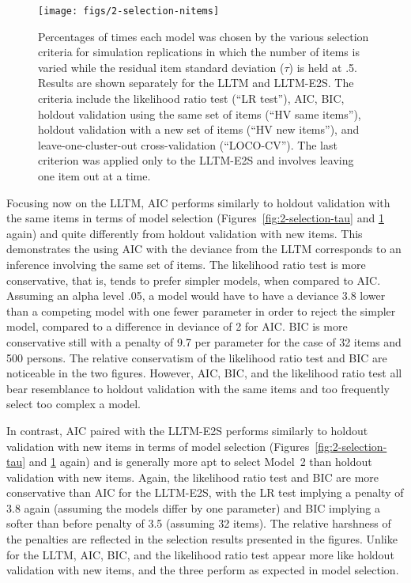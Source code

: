 \begin{figure}
	\centering
	\texttt{[image: figs/2-selection-nitems]}
	\caption{Percentages of times each model was chosen by the various selection criteria for simulation replications in which the number of items is varied while the residual item standard deviation ($\tau$) is held at .5. Results are shown separately for the LLTM and LLTM-E2S. The criteria include the likelihood ratio test (``LR test''), AIC, BIC, holdout validation using the same set of items (``HV same items''), holdout validation with a new set of items (``HV new items''), and leave-one-cluster-out cross-validation (``LOCO-CV''). The last criterion was applied only to the LLTM-E2S and involves leaving one item out at a time.}
	\label{fig:2-selection-nitems}
\end{figure}

Focusing now on the LLTM, AIC performs similarly to holdout validation with the same items in terms of model selection (Figures~\ref{fig:2-selection-tau} and \ref{fig:2-selection-nitems} again) and quite differently from holdout validation with new items. This demonstrates the using AIC with the deviance from the LLTM corresponds to an inference involving the same set of items. The likelihood ratio test is more conservative, that is, tends to prefer simpler models, when compared to AIC. Assuming an alpha level .05, a model would have to have a deviance 3.8 lower than a competing model with one fewer parameter in order to reject the simpler model, compared to a difference in deviance of 2 for AIC. BIC is more conservative still with a penalty of 9.7 per parameter for the case of 32 items and 500 persons. The relative conservatism of the likelihood ratio test and BIC are noticeable in the two figures. However, AIC, BIC, and the likelihood ratio test all bear resemblance to holdout validation with the same items and too frequently select too complex a model.

In contrast, AIC paired with the LLTM-E2S performs similarly to holdout validation with new items in terms of model selection (Figures~\ref{fig:2-selection-tau} and \ref{fig:2-selection-nitems} again) and is generally more apt to select Model~2 than holdout validation with new items. Again, the likelihood ratio test and BIC are more conservative than AIC for the LLTM-E2S, with the LR test implying a penalty of 3.8 again (assuming the models differ by one parameter) and BIC implying a softer than before penalty of 3.5 (assuming 32 items). The relative harshness of the penalties are reflected in the selection results presented in the figures. Unlike for the LLTM, AIC, BIC, and the likelihood ratio test appear more like holdout validation with new items, and the three perform as expected in model selection.

